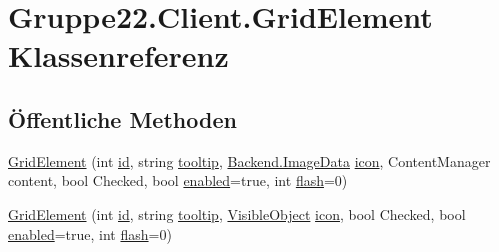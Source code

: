 \hypertarget{class_gruppe22_1_1_client_1_1_grid_element}{\section{Gruppe22.\-Client.\-Grid\-Element Klassenreferenz}
\label{class_gruppe22_1_1_client_1_1_grid_element}
}
\subsection*{Öffentliche Methoden}
\begin{DoxyCompactItemize}
\item 
\hyperlink{class_gruppe22_1_1_client_1_1_grid_element_a61548e525729e284b79b5c62242a21e5}{Grid\-Element} (int \hyperlink{class_gruppe22_1_1_client_1_1_grid_element_ade695078dc93f47e1f5891408d65d7a7}{id}, string \hyperlink{class_gruppe22_1_1_client_1_1_grid_element_ae5630d8dff48a5516d96af9ce6da566f}{tooltip}, \hyperlink{class_gruppe22_1_1_backend_1_1_image_data}{Backend.\-Image\-Data} \hyperlink{class_gruppe22_1_1_client_1_1_grid_element_a2a648989f64d0d4d897496958b01b7b0}{icon}, Content\-Manager content, bool Checked, bool \hyperlink{class_gruppe22_1_1_client_1_1_grid_element_a1f939562cf4dca6a69de78dd3a44a1fe}{enabled}=true, int \hyperlink{class_gruppe22_1_1_client_1_1_grid_element_a3d2ee9e08f1d3fbbf3b3e8b09d7fd5c3}{flash}=0)
\item 
\hyperlink{class_gruppe22_1_1_client_1_1_grid_element_a253fdf7cf4779c99006b4a2c3422ecc7}{Grid\-Element} (int \hyperlink{class_gruppe22_1_1_client_1_1_grid_element_ade695078dc93f47e1f5891408d65d7a7}{id}, string \hyperlink{class_gruppe22_1_1_client_1_1_grid_element_ae5630d8dff48a5516d96af9ce6da566f}{tooltip}, \hyperlink{class_gruppe22_1_1_client_1_1_visible_object}{Visible\-Object} \hyperlink{class_gruppe22_1_1_client_1_1_grid_element_a2a648989f64d0d4d897496958b01b7b0}{icon}, bool Checked, bool \hyperlink{class_gruppe22_1_1_client_1_1_grid_element_a1f939562cf4dca6a69de78dd3a44a1fe}{enabled}=true, int \hyperlink{class_gruppe22_1_1_client_1_1_grid_element_a3d2ee9e08f1d3fbbf3b3e8b09d7fd5c3}{flash}=0)
\end{DoxyCompactItemize}
